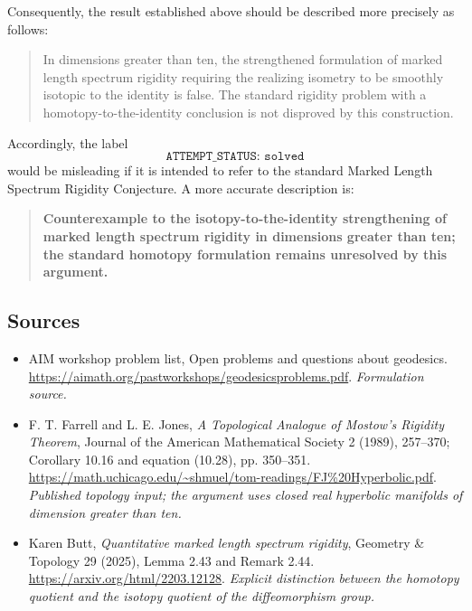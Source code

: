 \documentclass[11pt]{article}
\begin{document}
Consequently, the result established above should be described more
precisely as follows:

\begin{quote}
In dimensions greater than ten, the strengthened formulation of marked
length spectrum rigidity requiring the realizing isometry to be smoothly
isotopic to the identity is false.  The standard rigidity problem with a
homotopy-to-the-identity conclusion is not disproved by this construction.
\end{quote}

Accordingly, the label
\[
\texttt{ATTEMPT\_STATUS: solved}
\]
would be misleading if it is intended to refer to the standard Marked Length
Spectrum Rigidity Conjecture.  A more accurate description is:

\begin{quote}
\textbf{Counterexample to the isotopy-to-the-identity strengthening of
marked length spectrum rigidity in dimensions greater than ten; the standard
homotopy formulation remains unresolved by this argument.}
\end{quote}


\subsection{Sources}
\begin{itemize}
\item[S1]AIM workshop problem list, Open problems and questions about geodesics.
\url{https://aimath.org/pastworkshops/geodesicsproblems.pdf}.
\textit{Formulation source.}
\item[E1]F. T. Farrell and L. E. Jones, \emph{A Topological Analogue of Mostow's Rigidity Theorem}, Journal of the American Mathematical Society 2 (1989), 257--370; Corollary 10.16 and equation (10.28), pp. 350--351.
\url{https://math.uchicago.edu/~shmuel/tom-readings/FJ%20Hyperbolic.pdf}.
\textit{Published topology input; the argument uses closed real hyperbolic manifolds of dimension greater than ten.}
\item[E2]Karen Butt, \emph{Quantitative marked length spectrum rigidity}, Geometry \& Topology 29 (2025), Lemma 2.43 and Remark 2.44.
\url{https://arxiv.org/html/2203.12128}.
\textit{Explicit distinction between the homotopy quotient and the isotopy quotient of the diffeomorphism group.}
\end{itemize}
\end{document}
